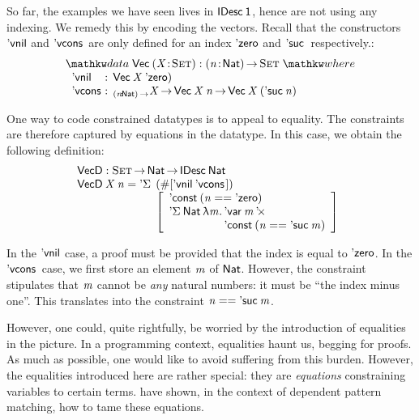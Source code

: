 \newcommand{\VecD}{\C{VecD}}
\newcommand{\VecNil}{\etag{\CN{vnil}}}
\newcommand{\VecCons}[2]{\etag{\CN{vcons}}\:#1\:#2}

So far, the examples we have seen lives in $\IDesc{\Unit}$, hence are
not using any indexing. We remedy this by encoding the vectors. Recall
that the constructors $\VecNil$ and $\VecCons{\!}{\!}$ are only defined for an
index $\NatZero$ and $\NatSuc$ respectively.:
%
\[
\stk{
\data \D{Vec}\: \PITEL{\V{X}}{\Set} : \PI{\V{n}}{\Nat} \Set \where \\
\;\;\begin{array}{@{}l@{\::\:\:}l@{\quad}l}
    \VecNil          & \D{Vec}\:\V{X}\:{\NatZero)}   \\
    \VecCons{\!}{\!} & _{\PI{\V{n}}{\Nat}}\V{X} \To \D{Vec}\:{\V{X}}\:{\V{n}} \To \D{Vec}\:{\V{X}}\:{(\NatSuc{\V{n}})}
\end{array}
}
\]

One way to code constrained datatypes is to appeal to equality. The
constraints are therefore captured by equations in the datatype. In
this case, we obtain the following definition:
%
\[\stk{
\VecD : \Set \To \Nat \To \IDesc{\Nat} \\
\begin{array}{@{}ll}
\VecD\: \V{X}\: \V{n} = \DSigma{\!}{\!} \!\!\!\!& (\EnumT{\sqr{ \VecNil\:\VecCons{\!}{\!} }}) \\
                        & \bigRedBracket{
                          \begin{array}{l}
                            \DConst{(\V{n} \PropEq \NatZero)} \\
                            \DSigma{\Nat}{\LAM{\V{m}} \stk{\DProd{\DVar{\V{m}}}{\\\DConst{(\V{n} \PropEq \NatSuc{\V{m}})}}}}
                          \end{array}
                          }
\end{array}
}\]

In the $\VecNil$ case, a proof must be provided that the index is
equal to $\NatZero$. In the $\VecCons{\!}{\!}$ case, we first store an element
$\V{m}$ of $\Nat$. However, the constraint stipulates that $\V{m}$
cannot be \emph{any} natural numbers: it must be ``the index minus
one''. This translates into the constraint $\V{n} \PropEq
\NatSuc{\V{m}}$.

However, one could, quite rightfully, be worried by the introduction
of equalities in the picture. In a programming context, equalities
haunt us, begging for proofs. As much as possible, one would like to
avoid suffering from this burden. However, the equalities introduced
here are rather special: they are \emph{equations} constraining
variables to certain terms. \citet{goguen:pattern-matching} have
shown, in the context of dependent pattern matching, how to tame these
equations.

